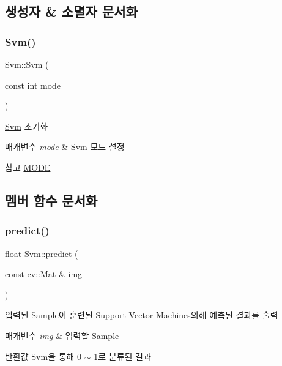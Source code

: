 \subsection{생성자 \& 소멸자 문서화}
\mbox{\label{class_svm_a762af972a037686ea80d9896905f57ed}} 
\subsubsection{\texorpdfstring{Svm()}{Svm()}}
{\footnotesize\ttfamily Svm\+::\+Svm (\begin{DoxyParamCaption}\item[{const int}]{mode }\end{DoxyParamCaption})}



\hyperlink{class_svm}{Svm} 초기화 


\begin{DoxyParams}{매개변수}
{\em mode} & \hyperlink{class_svm}{Svm} 모드 설정 \\
\hline
\end{DoxyParams}
\begin{DoxySeeAlso}{참고}
\hyperlink{class_svm_a479f12db422de0a4c4d46900ee154928}{M\+O\+DE} 
\end{DoxySeeAlso}


\subsection{멤버 함수 문서화}
\mbox{\label{class_svm_ad157df6a49f7380a99232e5b8fa6b63e}} 
\subsubsection{\texorpdfstring{predict()}{predict()}}
{\footnotesize\ttfamily float Svm\+::predict (\begin{DoxyParamCaption}\item[{const cv\+::\+Mat \&}]{img }\end{DoxyParamCaption})}



입력된 Sample이 훈련된 Support Vector Machines의해 예측된 결과를 출력 


\begin{DoxyParams}{매개변수}
{\em img} & 입력할 Sample \\
\hline
\end{DoxyParams}
\begin{DoxyReturn}{반환값}
Svm을 통해 0 $\sim$ 1로 분류된 결과 
\end{DoxyReturn}
\mbox{\label{class_svm_afb95b76fa494604abcd022c5948fb728}} 
